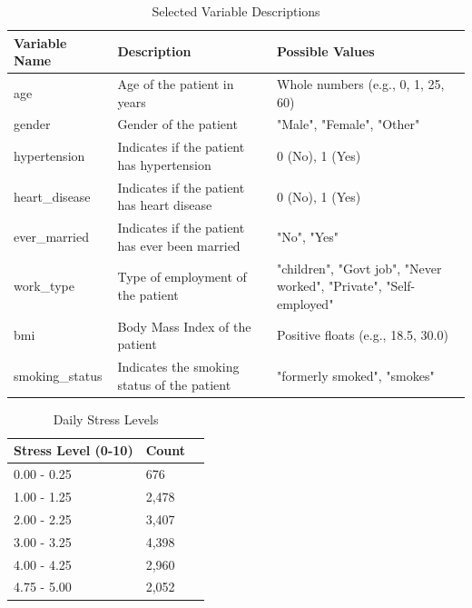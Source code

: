 \documentclass[runningheads]{llncs}
\begin{document}
\begin{enumerate}
\begin{table}  
\centering    
\caption{Selected Variable Descriptions}\label{tab1} 

\begin{tabular}{|l|l|l|} 
\hline     

\textbf{Variable Name} & \textbf{Description} & \textbf{Possible Values} \\        \hline        age & Age of the patient in years & Whole numbers (e.g., 0, 1, 25, 60) \\        \hline        gender & Gender of the patient & "Male", "Female", "Other" \\        \hline        hypertension & Indicates if the patient has hypertension & 0 (No), 1 (Yes) \\        \hline        heart\_disease & Indicates if the patient has heart disease & 0 (No), 1 (Yes) \\        \hline        ever\_married & Indicates if the patient has ever been married & "No", "Yes" \\        \hline        work\_type & Type of employment of the patient & "children", "Govt job", "Never worked", 
"Private", "Self-employed" \\        \hline        bmi & Body Mass Index of the patient & Positive floats (e.g., 18.5, 30.0) \\        \hline        smoking\_status & Indicates the smoking status of the patient & "formerly smoked", "smokes"\\        
\hline    
\end{tabular}    
\end{table}

\begin{table}[ht]
    \centering
    \caption{Daily Stress Levels}\label{tab1}
    \begin{tabular}{|l|l|l|}
        \hline
        \textbf{Stress Level (0-10)} & \textbf{Count} \\ 
        \hline
        0.00 - 0.25 & 676 \\ 
        1.00 - 1.25 & 2,478 \\ 
        2.00 - 2.25 & 3,407 \\ 
        3.00 - 3.25 & 4,398 \\ 
        4.00 - 4.25 & 2,960 \\ 
        4.75 - 5.00 & 2,052 \\ 
        \hline
    \end{tabular}
\end{table}


\end{enumerate}
\end{document}
